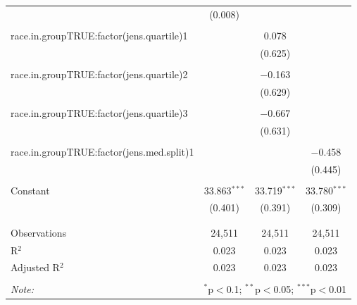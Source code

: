 \begin{table}[!htbp]
\begin{tabular}{@{\extracolsep{5pt}}lccc}
  & (0.008) &  &  \\ 
  & & & \\ 
 race.in.groupTRUE:factor(jens.quartile)1 &  & 0.078 &  \\ 
  &  & (0.625) &  \\ 
  & & & \\ 
 race.in.groupTRUE:factor(jens.quartile)2 &  & $-$0.163 &  \\ 
  &  & (0.629) &  \\ 
  & & & \\ 
 race.in.groupTRUE:factor(jens.quartile)3 &  & $-$0.667 &  \\ 
  &  & (0.631) &  \\ 
  & & & \\ 
 race.in.groupTRUE:factor(jens.med.split)1 &  &  & $-$0.458 \\ 
  &  &  & (0.445) \\ 
  & & & \\ 
 Constant & 33.863$^{***}$ & 33.719$^{***}$ & 33.780$^{***}$ \\ 
  & (0.401) & (0.391) & (0.309) \\ 
  & & & \\ 
\hline \\[-1.8ex] 
Observations & 24,511 & 24,511 & 24,511 \\ 
R$^{2}$ & 0.023 & 0.023 & 0.023 \\ 
Adjusted R$^{2}$ & 0.023 & 0.023 & 0.023 \\ 
\hline 
\hline \\[-1.8ex] 
\textit{Note:}  & \multicolumn{3}{r}{$^{*}$p$<$0.1; $^{**}$p$<$0.05; $^{***}$p$<$0.01} \\ 
\end{tabular} 
\end{table} 
